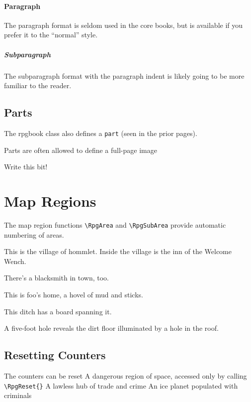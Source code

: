 					\paragraph{Paragraph}
					The paragraph format is seldom used in the core books, but is available if you prefer it to the ``normal'' style.

					\subparagraph{Subparagraph}
					The subparagraph format with the paragraph indent is likely going to be more familiar to the reader.
			\subsection{Parts}

				The rpgbook class also defines a \verb|part| (seen in the prior pages).

				Parts are often allowed to define a full-page image

				{\color{red} Write this bit!}
		\section{Map Regions}
			The map region functions \verb|\RpgArea| and \verb|\RpgSubArea| provide automatic numbering of areas.


			\RpgSetAreaOptions[area-label=village,area-num-depth=3]{}
			This is the village of hommlet.
			\RpgSetAreaOptions[area-label=villages,area-num-depth=3]{}
			Inside the village is the inn of the Welcome Wench.

			There's a blacksmith in town, too.

			This is foo's home, a hovel of mud and sticks.

			This ditch has a board spanning it.

			A five-foot hole reveals the dirt floor illuminated by a hole in the roof.




			\subsection{Resetting Counters}

				The counters can be reset
			\RpgSetAreaOptions[area-label=space]{}
			\RpgResetAreas{}
				A dangerous region of space, accessed only by calling \verb|\RpgReset{}|
					A lawless hub of trade and crime
					An ice planet populated with criminals

